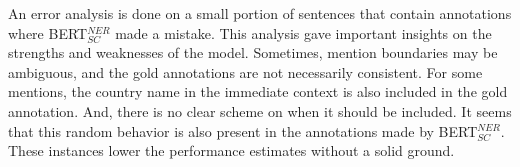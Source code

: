 \documentclass{report}
\theoremstyle{definition}
\theoremstyle{remark}
\begin{document}
An error analysis is done on a small portion of sentences that contain annotations where BERT$_{SC}^{NER}$ made a mistake. This analysis gave important insights on the strengths and weaknesses of the model. Sometimes, mention boundaries may be ambiguous, and the gold annotations are not necessarily consistent. For some mentions, the country name in the immediate context is also included in the gold annotation. And, there is no clear scheme on when it should be included. It seems that this random behavior is also present in the annotations made by BERT$_{SC}^{NER}$. These instances lower the performance estimates without a solid ground.
\newline
\begin{center}
\end{center}
\end{document}
